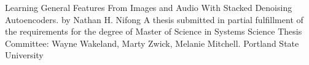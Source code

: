 \documentclass[12pt]{article}
\begin{document}
         


\begin{center}
\break \break \break \break 

Learning General Features From Images and Audio With Stacked Denoising Autoencoders.
\break\break\break\break \break \break \break \break \break 
by \break \break Nathan H. Nifong
\break\break\break\break \break \break \break \break \break 
A thesis submitted in partial fulfillment of the\break
requirements for the degree of
\break\break\break\break 
Master of Science \break in \break Systems Science
\break\break\break\break \break 
Thesis Committee: \break Wayne Wakeland, \break Marty Zwick, \break Melanie Mitchell.
\break\break\break\break 
Portland State University 
\end{center}

\begin{singlespacing}
\tableofcontents
\end{singlespacing}
\end{document}
